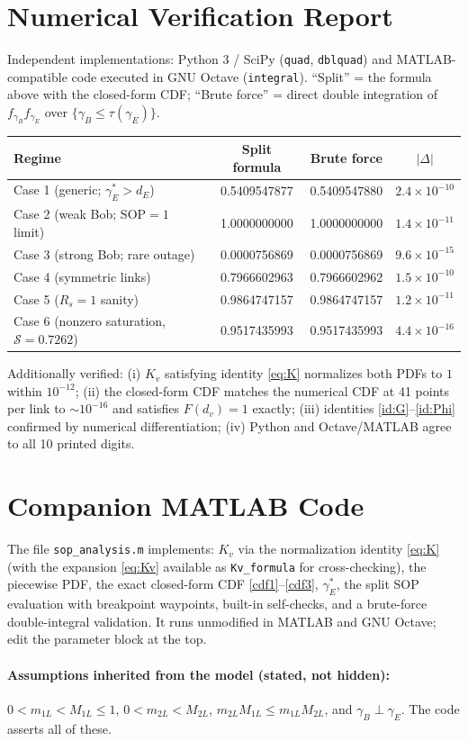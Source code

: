 \documentclass[11pt]{article}
\begin{document}
\section{Numerical Verification Report}
Independent implementations: Python 3 / SciPy (\texttt{quad}, \texttt{dblquad}) and MATLAB-compatible code executed in GNU Octave (\texttt{integral}). ``Split'' = the formula above with the closed-form CDF; ``Brute force'' = direct double integration of $f_{\gamma_B}f_{\gamma_E}$ over $\{\gamma_B\le\tau(\gamma_E)\}$.
\begin{center}\small
\begin{tabular}{lccc}
\toprule
Regime & Split formula & Brute force & $|\Delta|$\\
\midrule
Case 1 (generic; $\gamma_E^{*}>d_E$) & 0.5409547877 & 0.5409547880 & $2.4\times10^{-10}$\\
Case 2 (weak Bob; $\mathrm{SOP}=1$ limit) & 1.0000000000 & 1.0000000000 & $1.4\times10^{-11}$\\
Case 3 (strong Bob; rare outage) & 0.0000756869 & 0.0000756869 & $9.6\times10^{-15}$\\
Case 4 (symmetric links) & 0.7966602963 & 0.7966602962 & $1.5\times10^{-10}$\\
Case 5 ($R_s=1$ sanity) & 0.9864747157 & 0.9864747157 & $1.2\times10^{-11}$\\
Case 6 (nonzero saturation, $\mathcal S=0.7262$) & 0.9517435993 & 0.9517435993 & $4.4\times10^{-16}$\\
\bottomrule
\end{tabular}
\end{center}
Additionally verified: (i) $K_v$ satisfying identity \eqref{eq:K} normalizes both PDFs to $1$ within $10^{-12}$; (ii) the closed-form CDF matches the numerical CDF at 41 points per link to $\sim 10^{-16}$ and satisfies $F(d_v)=1$ exactly; (iii) identities \eqref{id:G}--\eqref{id:Phi} confirmed by numerical differentiation; (iv) Python and Octave/MATLAB agree to all 10 printed digits.

\section{Companion MATLAB Code}
The file \texttt{sop\_analysis.m} implements: $K_v$ via the normalization identity \eqref{eq:K} (with the expansion \eqref{eq:Kv} available as \texttt{Kv\_formula} for cross-checking), the piecewise PDF, the exact closed-form CDF \eqref{cdf1}--\eqref{cdf3}, $\gamma_E^{*}$, the split SOP evaluation with breakpoint waypoints, built-in self-checks, and a brute-force double-integral validation. It runs unmodified in MATLAB and GNU Octave; edit the parameter block at the top.

\paragraph{Assumptions inherited from the model (stated, not hidden):} $0<m_{1L}<M_{1L}\le1$, $0<m_{2L}<M_{2L}$, $m_{2L}M_{1L}\le m_{1L}M_{2L}$, and $\gamma_B\perp\gamma_E$. The code asserts all of these.
\end{document}

